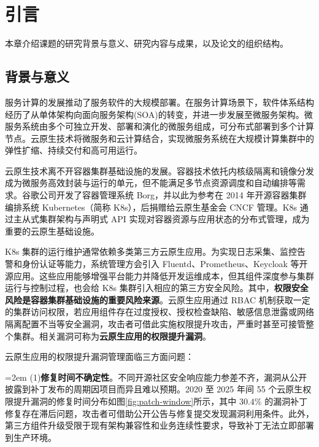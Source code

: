 \chapter{引言}
本章介绍课题的研究背景与意义、研究内容与成果，以及论文的组织结构。
\section{背景与意义}

服务计算的发展推动了服务软件的大规模部署\cite{bouguettaya2017service}。在服务计算场景下，软件体系结构经历了从单体架构向面向服务架构(SOA)的转变，并进一步发展至微服务架构\cite{zhong2024ddd}。微服务系统由多个可独立开发、部署和演化的微服务组成，可分布式部署到多个计算节点。云原生技术将微服务和云计算结合，实现微服务系统在大规模计算集群中的弹性扩缩、持续交付和高可用运行\cite{cncf2024definition,cncfwhoweare}。

云原生技术离不开容器集群基础设施的发展。容器技术依托内核级隔离和镜像分发成为微服务高效封装与运行的单元\cite{wuyiwen2023docker}，但不能满足多节点资源调度和自动编排等需求。谷歌公司开发了容器管理系统 Borg\cite{Verma_2015}，并以此为参考在 2014 年开源容器集群编排系统 Kubernetes（简称 K8s），后捐赠给云原生基金会 CNCF\cite{lawson2026cncf} 管理。K8s 通过主从式集群架构与声明式 API 实现对容器资源与应用状态的分布式管理，成为重要的云原生基础设施。

K8s 集群的运行维护通常依赖多类第三方云原生应用。为实现日志采集、监控告警和身份认证等能力，系统管理方会引入 Fluentd、Prometheus、Keycloak 等开源应用。这些应用能够增强平台能力并降低开发运维成本，但其组件深度参与集群运行与控制过程，也会给 K8s 集群引入相应的第三方安全风险。其中，\textbf{权限安全风险是容器集群基础设施的重要风险来源}。云原生应用通过 RBAC 机制\cite{ferraiolo1995role}获取一定的集群访问权限，若应用组件存在过度授权\cite{gu2024epscan}、授权检查缺陷、敏感信息泄露\cite{kubeguard_icws2025}或网络隔离配置不当等安全漏洞，攻击者可借此实施权限提升攻击，严重时甚至可接管整个集群\cite{yang2023take}。相关漏洞可称为\textbf{云原生应用的权限提升漏洞}。

云原生应用的权限提升漏洞管理面临三方面问题：

\noindent\hangindent=2em (1)\textbf{修复时间不确定性}。不同开源社区安全响应能力参差不齐，漏洞从公开披露到补丁发布的周期因项目而异且难以预期。2020 至 2025 年间 55 个云原生权限提升漏洞的修复时间分布如图\ref{fig:patch-window}所示，其中 $30.4\%$ 的漏洞补丁修复存在滞后问题，攻击者可借助公开公告与修复提交发现漏洞利用条件。此外，第三方组件升级受限于现有架构兼容性和业务连续性要求，导致补丁无法立即部署到生产环境。

